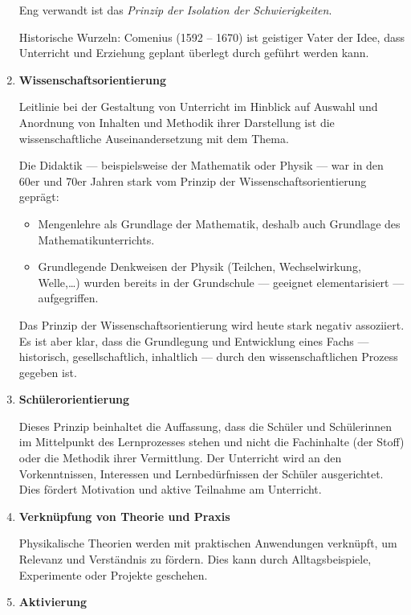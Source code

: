 \begin{enumerate}
	Eng verwandt ist das {\it Prinzip
	der Isolation der Schwierigkeiten}.
	
	Historische Wurzeln: Comenius (1592 -- 1670) ist
	geistiger Vater der Idee, dass Unterricht und Erziehung
	geplant \"{u}berlegt durch gef\"{u}hrt werden kann.
	
	\item{\textbf{Wissenschaftsorientierung}}
	
	Leitlinie bei der Gestaltung von Unterricht im Hinblick auf
	Auswahl und Anordnung von Inhalten und Methodik ihrer Darstellung
	ist die wissenschaftliche Auseinandersetzung mit dem Thema.
	
	\mip
	Die Didaktik --- beispielsweise der Mathematik oder Physik ---
	war in den 60er und 70er Jahren stark vom Prinzip der
	Wissenschaftsorientierung gepr\"{a}gt:
	\begin{itemize}
		\item Mengenlehre als Grundlage der Mathematik, deshalb auch
		Grundlage des Mathematikunterrichts.
		\item Grundlegende Denkweisen der Physik
		(Teilchen, Wechselwirkung, Welle,\dots) wurden bereits in der
		Grundschule --- geeignet elementarisiert --- aufgegriffen.
	\end{itemize}
	
	Das Prinzip der Wissenschaftsorientierung wird heute stark
	negativ assoziiert.
	Es ist aber klar, dass die Grundlegung und Entwicklung eines
	Fachs --- historisch, gesellschaftlich, inhaltlich ---
	durch den wissenschaftlichen Prozess gegeben ist.
	
	\item{\textbf{Sch\"{u}lerorientierung}}
	
	Dieses Prinzip beinhaltet die Auffassung, dass die
	Sch\"{u}ler und Sch\"{u}lerinnen im Mittelpunkt des Lernprozesses stehen
	und nicht die Fachinhalte (der Stoff) oder die Methodik ihrer
	Vermittlung.  Der Unterricht wird an den Vorkenntnissen, Interessen und Lernbed\"{u}rfnissen der Sch\"{u}ler ausgerichtet. Dies f\"{o}rdert Motivation und aktive Teilnahme am Unterricht.
	
	\item{\textbf{Verkn\"{u}pfung von Theorie und Praxis}}
	
	Physikalische Theorien werden mit praktischen Anwendungen verkn\"{u}pft, um Relevanz und Verst\"{a}ndnis zu f\"{o}rdern. Dies kann durch Alltagsbeispiele, Experimente oder Projekte geschehen.
	
	\item{\textbf{Aktivierung}}
	

\end{enumerate}
